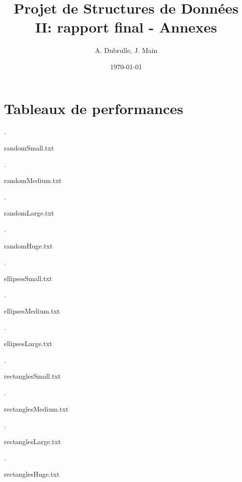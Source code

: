 \documentclass[a4paper, 12pt]{article}
\title{Projet de Structures de Données II: rapport final - Annexes}
\author{A. Dubrulle, J. Main}
\date{\today}
\theoremstyle{definition} \newtheorem{df}{D\'{e}finition}[section]
\theoremstyle{definition} \newtheorem{ex}[df]{Exemple}
\theoremstyle{definition} \newtheorem{thm}[df]{Th\'{e}or\`{e}me}
\theoremstyle{definition} \newtheorem{cor}[df]{Corollaire}
\theoremstyle{definition} \newtheorem{lem}[df]{Lemme}
\theoremstyle{definition} \newtheorem{obs}[df]{Observation}
\theoremstyle{definition} \newtheorem{prop}[df]{Proposition}
\theoremstyle{definition} \newtheorem{rem}[df]{Remarque}
\begin{document}
\maketitle
\tableofcontents
\section{Tableaux de performances}


\begin{table}[h].
\caption{randomSmall.txt}

\end{table}

\begin{table}[h]. 
\caption{randomMedium.txt}

\end{table}

\begin{table}[h].
\caption{randomLarge.txt}

\end{table}

\begin{table}[h].
\caption{randomHuge.txt}

\end{table}


\begin{table}[h].
\caption{ellipsesSmall.txt}

\end{table}

\begin{table}[h].
\caption{ellipsesMedium.txt}

\end{table}

\begin{table}[h].
\caption{ellipsesLarge.txt}

\end{table}

\begin{table}[h].
\caption{rectanglesSmall.txt}

\end{table}

\begin{table}[h].
\caption{rectanglesMedium.txt}

\end{table}

\begin{table}[h].
\caption{rectanglesLarge.txt}

\end{table}

\begin{table}[h].
\caption{rectanglesHuge.txt}

\end{table}
\end{document}
